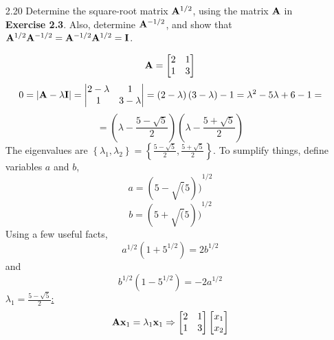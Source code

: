 \begin{enumerate}[font=\bfseries]
\begin{enumerate}
        \end{enumerate}
        \item[2.20] Determine the square-root matrix $\bold{A}^{1/2}$, using the matrix $\bold{A}$ in \textbf{Exercise 2.3}. Also, determine
        $\bold{A}^{-1/2}$, and show that $\bold{A}^{1/2}\bold{A}^{-1/2} = \bold{A}^{-1/2}\bold{A}^{1/2} = \bold{I}$.
        \par
        \[
            \bold{A}
            =
            \begin{bmatrix}
                2 & 1 \\
                1 & 3
            \end{bmatrix}
        \]
        \[
            0 = \left|\bold{A} - \lambda\bold{I}\right|
            =
            \left|
            \begin{matrix}
                2 - \lambda & 1 \\
                1 & 3 - \lambda
            \end{matrix}
            \right|
            =
            \left(2 - \lambda\right)\left(3 - \lambda\right) - 1
            =
            \lambda^2 - 5\lambda + 6 - 1
            =
        \]
        \[
            =
            \left(\lambda - \frac{5 - \sqrt{5}}{2}\right)\left(\lambda - \frac{5 + \sqrt{5}}{2}\right)
        \]
        The eigenvalues are $\left\{\lambda_1, \lambda_2\right\} = \left\{\frac{5 - \sqrt{5}}{2}, \frac{5 + \sqrt{5}}{2}\right\}$.
        \newline
        To sumplify things, define variables $a$ and $b$,
        \[
            a = {(5-\sqrt(5))}^{1/2}
        \]
        \[
            b = {(5+\sqrt(5))}^{1/2}
        \]
        Using a few useful facts,
        \[
            a^{1/2}(1 + 5^{1/2}) = 2b^{1/2}
        \]
        and
        \[
            b^{1/2}(1 - 5^{1/2}) = -2a^{1/2}
        \]
        \underline{$\lambda_1 = \frac{5 - \sqrt{5}}{2}$:}
        \[
            \bold{A}\bold{x}_1 = \lambda_1 \bold{x}_1
            \Rightarrow
            \begin{bmatrix}
                2 & 1 \\
                1 & 3
            \end{bmatrix}
            \begin{bmatrix}
                x_1 \\
                x_2
            \end{bmatrix}
\]
\end{enumerate}
